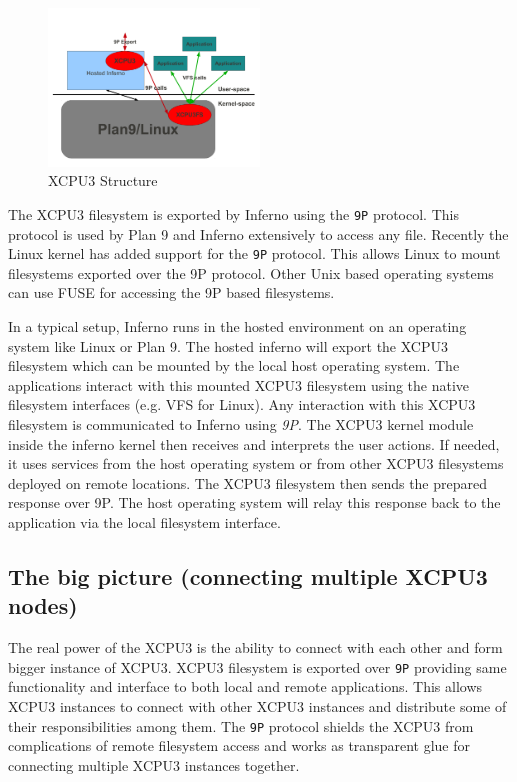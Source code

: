 \begin{figure}[h]
  \begin{center}
    \leavevmode
      \includegraphics[height=0.2\textheight,width=0.5\textwidth]
		{./img/XCPU3Structure}
    \caption{XCPU3 Structure}
    \label{fig:XCPU3}
  \end{center}
\end{figure}

The XCPU3 filesystem is exported by Inferno using the \texttt{9P} protocol. 
This protocol is used by Plan 9 and Inferno extensively to access any file. 
Recently the Linux kernel has added support for the \texttt{9P}
protocol\cite{graverobbers}.  This allows Linux to mount filesystems
exported over the 9P protocol.  Other Unix based operating systems can use
FUSE\cite{FUSE} for accessing the 9P based filesystems. 

In a typical setup, Inferno runs in the hosted environment on an operating
system like Linux or Plan 9.  The hosted inferno will export the XCPU3
filesystem which can be mounted by the local host operating system. The 
applications interact with this mounted XCPU3 filesystem using the native
filesystem interfaces (e.g. VFS for Linux). Any interaction with this XCPU3
filesystem is communicated to Inferno using \textit{9P}. The XCPU3 kernel module
inside the inferno kernel then receives and interprets the user actions.  If
needed, it uses services from the host operating system or from other XCPU3
filesystems deployed on remote locations.  The XCPU3 filesystem then sends the
prepared response over 9P. The host operating system will relay this response
back to the application via the local filesystem interface.


\subsection{The big picture (connecting multiple XCPU3 nodes)}
The real power of the XCPU3 is the ability to connect with each other and form
bigger instance of XCPU3.  XCPU3 filesystem is exported over \texttt{9P}
providing same functionality and interface to both local and remote
applications.  This allows XCPU3 instances to connect with other XCPU3
instances and distribute some of their responsibilities among them.
The \texttt{9P} protocol shields the XCPU3 from complications of remote
filesystem access and works as transparent glue for connecting multiple XCPU3
instances together.

